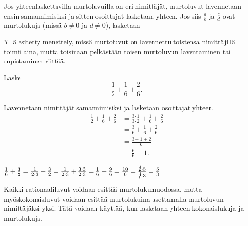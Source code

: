 Jos yhteenlaskettavilla murtoluvuilla on eri nimittäjät, murtoluvut lavennetaan ensin samannimisiksi ja sitten osoittajat lasketaan yhteen. Jos siis $\frac{a}{b}$ ja $\frac{c}{d}$ ovat murtolukuja (missä $b \neq 0$ ja $d \neq 0$), lasketaan

 
Yllä esitetty menettely, missä murtoluvut on lavennettu toistensa nimittäjillä toimii aina, mutta toisinaan pelkästään toisen murtoluvun laventaminen tai supistaminen riittää.

\begin{esimerkki}
        Laske
        \[
        \frac{1}{2} + \frac{1}{6} + \frac{2}{6}.
        \]
        
        \begin{esimratk}
        Lavennetaan nimittäjät samannimisiksi ja lasketaan osoittajat yhteen.
        \begin{align*}
            \frac{1}{2} + \frac{1}{6} + \frac{2}{6} &=\frac{3\cdot 1}{3\cdot 2} + \frac{1}{6} + \frac{2}{6}\\
            										&=\frac{3}{6} + \frac{1}{6} + \frac{2}{6}\\
           											&= \frac{3+1+2}{6}\\
           											&= \frac{6}{6} = 1.
        \end{align*}
        \end{esimratk}
    \end{esimerkki}
    
\begin{esimerkki}

$ \frac{1}{6} + \frac{3}{2} = \frac{1}{2\cdot 3} + \frac{3}{2} = \frac{1}{2 \cdot 3} + \frac{3 \cdot 3}{2 \cdot 3} = \frac{1}{6} + \frac{9}{6} = \frac{10}{6} = \frac{\cancel{2} \cdot 5}{\cancel{2} \cdot 3} = \frac{5}{3}$

\end{esimerkki}    
    
    Kaikki rationaaliluvut voidaan esittää murtolukumuodossa, mutta myöskokonaisluvut voidaan esittää murtolukuina asettamalla murtoluvun nimittäjäksi yksi. Tätä voidaan käyttää, kun lasketaan yhteen kokonaislukuja ja murtolukuja.
    

